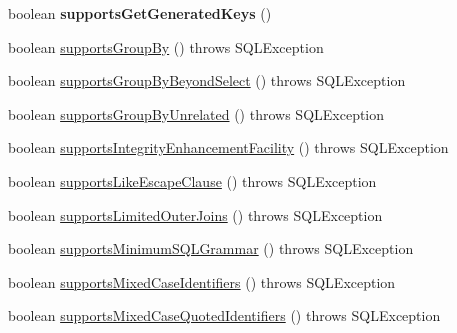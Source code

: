 \begin{DoxyCompactItemize}
\item 
\mbox{\label{classcom_1_1mysql_1_1cj_1_1jdbc_1_1_database_meta_data_a08f5b43c8177389c11a0f2c4a13f6426}} 
boolean {\bfseries supports\+Get\+Generated\+Keys} ()
\item 
boolean \mbox{\hyperlink{classcom_1_1mysql_1_1cj_1_1jdbc_1_1_database_meta_data_a3afb86e4ce9852aaf9683f6d1e9909d4}{supports\+Group\+By}} ()  throws S\+Q\+L\+Exception 
\item 
boolean \mbox{\hyperlink{classcom_1_1mysql_1_1cj_1_1jdbc_1_1_database_meta_data_a5655d927fa31f72f9733ce0c45198dfb}{supports\+Group\+By\+Beyond\+Select}} ()  throws S\+Q\+L\+Exception 
\item 
boolean \mbox{\hyperlink{classcom_1_1mysql_1_1cj_1_1jdbc_1_1_database_meta_data_a9bcc49c4561df257fc14d5c5fec1381d}{supports\+Group\+By\+Unrelated}} ()  throws S\+Q\+L\+Exception 
\item 
boolean \mbox{\hyperlink{classcom_1_1mysql_1_1cj_1_1jdbc_1_1_database_meta_data_a05da0f08a0671d0ec87699253795a717}{supports\+Integrity\+Enhancement\+Facility}} ()  throws S\+Q\+L\+Exception 
\item 
boolean \mbox{\hyperlink{classcom_1_1mysql_1_1cj_1_1jdbc_1_1_database_meta_data_af183fff36d3a59d863a2b46c54b89faf}{supports\+Like\+Escape\+Clause}} ()  throws S\+Q\+L\+Exception 
\item 
boolean \mbox{\hyperlink{classcom_1_1mysql_1_1cj_1_1jdbc_1_1_database_meta_data_ab68ca8f6a12d726396eb248f8b8ccce0}{supports\+Limited\+Outer\+Joins}} ()  throws S\+Q\+L\+Exception 
\item 
boolean \mbox{\hyperlink{classcom_1_1mysql_1_1cj_1_1jdbc_1_1_database_meta_data_a7dae04c8f5efcb5694f7d51e15c5deb5}{supports\+Minimum\+S\+Q\+L\+Grammar}} ()  throws S\+Q\+L\+Exception 
\item 
boolean \mbox{\hyperlink{classcom_1_1mysql_1_1cj_1_1jdbc_1_1_database_meta_data_af9e1b9edcaf35b135c9fb44aaa03f99a}{supports\+Mixed\+Case\+Identifiers}} ()  throws S\+Q\+L\+Exception 
\item 
boolean \mbox{\hyperlink{classcom_1_1mysql_1_1cj_1_1jdbc_1_1_database_meta_data_ac7f546c53a94116455183e4d16331940}{supports\+Mixed\+Case\+Quoted\+Identifiers}} ()  throws S\+Q\+L\+Exception 
\item 
\mbox{\label{classcom_1_1mysql_1_1cj_1_1jdbc_1_1_database_meta_data_a347d467d5e02962df8782b6b3b1f56d6}} 

\end{DoxyCompactItemize}
